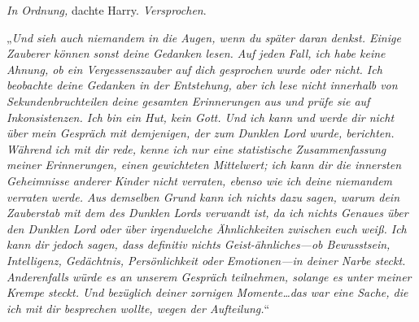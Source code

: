 \emph{In Ordnung,} dachte Harry. \emph{Versprochen}.

„\emph{Und sieh auch niemandem in die Augen, wenn du später daran denkst. Einige Zauberer können sonst deine Gedanken lesen. Auf jeden Fall, ich habe keine Ahnung, ob ein Vergessenszauber auf dich gesprochen wurde oder nicht. Ich beobachte deine Gedanken in der Entstehung, aber ich lese nicht innerhalb von Sekundenbruchteilen deine gesamten Erinnerungen aus und prüfe sie auf Inkonsistenzen. Ich bin ein Hut, kein Gott. Und ich kann und werde dir nicht über mein Gespräch mit demjenigen, der zum Dunklen Lord wurde, berichten. Während ich mit dir rede, \emph{kenne} ich nur eine statistische Zusammenfassung meiner Erinnerungen, einen gewichteten Mittelwert; ich \emph{kann} dir die innersten Geheimnisse anderer Kinder nicht verraten, ebenso wie ich deine niemandem verraten werde. Aus demselben Grund kann ich nichts dazu sagen, warum dein Zauberstab mit dem des Dunklen Lords verwandt ist, da ich nichts Genaues über den Dunklen Lord oder über irgendwelche Ähnlichkeiten zwischen euch weiß. Ich \emph{kann} dir jedoch sagen, dass definitiv nichts Geist-ähnliches—ob Bewusstsein, Intelligenz, Gedächtnis, Persönlichkeit oder Emotionen—in deiner Narbe steckt. Anderenfalls würde es an unserem Gespräch teilnehmen, solange es unter meiner Krempe steckt. Und bezüglich deiner zornigen Momente…das war eine Sache, die ich mit dir besprechen wollte, wegen der Aufteilung.}“

